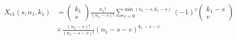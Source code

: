 \begin{equation}
\begin{split}
{X_{e1}}\left( {s,{n_1},{k_1}} \right) &= \left( {\begin{array}{*{20}{c}}
{{k_1}}\\
s
\end{array}} \right)\frac{{{n_1}!}}{{\left( {{n_1} - s} \right)!}}\sum\nolimits_{v = 0}^{\min \left( {{n_1} - s,{k_1} - s} \right)} {{{\left( { - 1} \right)}^v}\left( {\begin{array}{*{20}{c}}
{{k_1} - s}\\
v
\end{array}} \right)} \\
& \times \frac{{\left( {{n_1} - s} \right)!}}{{\left( {{n_1} - s - v} \right)!}}{\left( {{n_1} - s - v} \right)^{{k_1} - s - v}}
\end{split}
\end{equation}

